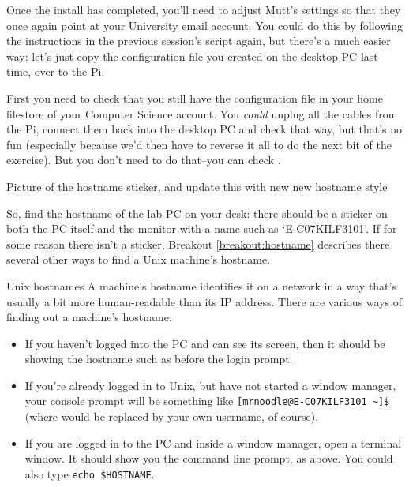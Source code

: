 
Once the install has completed, you'll need to adjust Mutt's settings so that they once again point at your University email account. You could do this by following the instructions in the previous session's script again, but there's a much easier way: let's just copy the configuration file you created on the desktop PC last time, over to the Pi. 

First you need to check that you still have the  configuration file in your home filestore of your Computer Science account. You \textit{could} unplug all the cables from the Pi, connect them back into the desktop PC and check that way, but that's no fun (especially because we'd then have to reverse it all to do the next bit of the exercise). But you don't need to do that--you can check . 

\begin{note}
Picture of the hostname sticker, and update this with new new hostname style
\end{note}

So, find the hostname of the lab PC on your desk: there should be a sticker on both the PC itself and the monitor with a name such as `E-C07KILF3101'. If for some reason there isn't a sticker, Breakout \ref{breakout:hostname} describes there several other ways to find a Unix machine's hostname. 


\begin{linux}{Unix hostnames}
\label{breakout:hostname}
A machine's hostname identifies it on a network in a way that's usually a bit more human-readable than its IP address. There are various ways of finding out a machine's hostname:

\begin{itemize}
\item If you haven't logged into the PC and can see its screen, then it should be showing the hostname such as  before the login prompt. 
\item If you're already logged in to Unix, but have not started a window manager, your console prompt will be something like  \verb|[mrnoodle@E-C07KILF3101 ~]$| (where  would be replaced by your own username, of course).
\item If you are logged in to the PC and inside a window manager, open a terminal window. It should show you the command line prompt, as above. You could also type \verb|echo $HOSTNAME|.
\end{itemize}
\end{linux}

